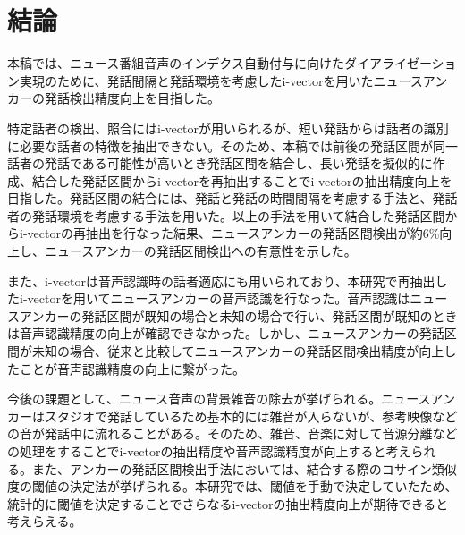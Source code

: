 \chapter{結論}
本稿では、ニュース番組音声のインデクス自動付与に向けたダイアライゼーション実現のために、発話間隔と発話環境を考慮したi-vectorを用いたニュースアンカーの発話検出精度向上を目指した。\par
特定話者の検出、照合にはi-vectorが用いられるが、短い発話からは話者の識別に必要な話者の特徴を抽出できない。そのため、本稿では前後の発話区間が同一話者の発話である可能性が高いとき発話区間を結合し、長い発話を擬似的に作成、結合した発話区間からi-vectorを再抽出することでi-vectorの抽出精度向上を目指した。発話区間の結合には、発話と発話の時間間隔を考慮する手法と、発話者の発話環境を考慮する手法を用いた。以上の手法を用いて結合した発話区間からi-vectorの再抽出を行なった結果、ニュースアンカーの発話区間検出が約6\%向上し、ニュースアンカーの発話区間検出への有意性を示した。\par
また、i-vectorは音声認識時の話者適応にも用いられており、本研究で再抽出したi-vectorを用いてニュースアンカーの音声認識を行なった。音声認識はニュースアンカーの発話区間が既知の場合と未知の場合で行い、発話区間が既知のときは音声認識精度の向上が確認できなかった。しかし、ニュースアンカーの発話区間が未知の場合、従来と比較してニュースアンカーの発話区間検出精度が向上したことが音声認識精度の向上に繋がった。\par
今後の課題として、ニュース音声の背景雑音の除去が挙げられる。ニュースアンカーはスタジオで発話しているため基本的には雑音が入らないが、参考映像などの音が発話中に流れることがある。そのため、雑音、音楽に対して音源分離などの処理をすることでi-vectorの抽出精度や音声認識精度が向上すると考えられる。また、アンカーの発話区間検出手法においては、結合する際のコサイン類似度の閾値の決定法が挙げられる。本研究では、閾値を手動で決定していたため、統計的に閾値を決定することでさらなるi-vectorの抽出精度向上が期待できると考えらえる。